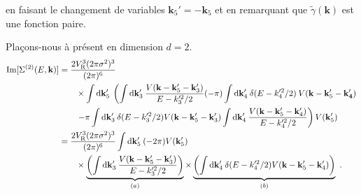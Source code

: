 en faisant le changement de variables $\mathbf{k}_{\mathrm{5}}'=-\mathbf{k}_{\mathrm{5}}$ et en remarquant que $\tilde{\gamma}(\mathbf{k}) $ est une fonction paire.

Plaçons-nous à présent en dimension $d=2$.
\begin{align}
\mathrm{Im}[ \Sigma^{(2)}(E,\mathbf{k})]&= \frac{2V_{\mathrm{R}}^3 (2\pi\sigma^2)^3}{(2\pi)^6} \\
&\nonumber \qquad\times\int{\mathop{}\mathopen{}\mathrm{d}\mathbf{k}_{\mathrm{5}}' \: \left( \int{\mathop{}\mathopen{}\mathrm{d}\mathbf{k}_{\mathrm{3}}' \: \frac{V(\mathbf{k}-\mathbf{k}_{\mathrm{5}}'-\mathbf{k}_{\mathrm{3}}')}{E-k_{\mathrm{3}}'^2/2}} (-\pi) \int{\mathop{}\mathopen{}\mathrm{d}\mathbf{k}_{\mathrm{4}}' \: \delta(E-k_{\mathrm{4}}'^2/2) \: V(\mathbf{k}-\mathbf{k}_{\mathrm{5}}'-\mathbf{k}_{\mathbf{4}}')} \right.} \\
&\nonumber \qquad \left.-\pi\int{\mathop{}\mathopen{}\mathrm{d}\mathbf{k}_{\mathrm{3}}' \: \delta(E-k_{\mathrm{3}}'^2/2) V(\mathbf{k}-\mathbf{k}_{\mathrm{5}}'-\mathbf{k}_{\mathrm{3}}')} \int{\mathop{}\mathopen{}\mathrm{d}\mathbf{k}_{\mathrm{4}}' \: \frac{V(\mathbf{k}-\mathbf{k}_{\mathrm{5}}'-\mathbf{k}_{\mathrm{4}}')}{E-k_{\mathrm{4}}'^2/2}}\right) V(\mathbf{k}_{\mathrm{5}}') \\
&= \frac{2V_{\mathrm{R}}^3 (2\pi\sigma^2)^3}{(2\pi)^6} \int{\mathop{}\mathopen{}\mathrm{d}\mathbf{k}_{\mathrm{5}}' \: (-2\pi) V(\mathbf{k}_{\mathrm{5}}')} \\
&\nonumber\qquad \times\underbrace{\left(\int{\mathop{}\mathopen{}\mathrm{d}\mathbf{k}_{\mathrm{3}}' \:\frac{V(\mathbf{k}-\mathbf{k}_{\mathrm{5}}'-\mathbf{k}_{\mathrm{3}}')}{E-k_{\mathrm{3}}'^2/2}}\right)}_{(a)} \times \underbrace{\left(\int{\mathop{}\mathopen{}\mathrm{d}\mathbf{k}_{\mathrm{4}}'\:\delta(E-k_{\mathrm{4}}'^2/2) V(\mathbf{k}-\mathbf{k}_{\mathrm{5}}'-\mathbf{k}_{\mathrm{4}}')}\right)}_{(b)} \text{ .}
\end{align}

